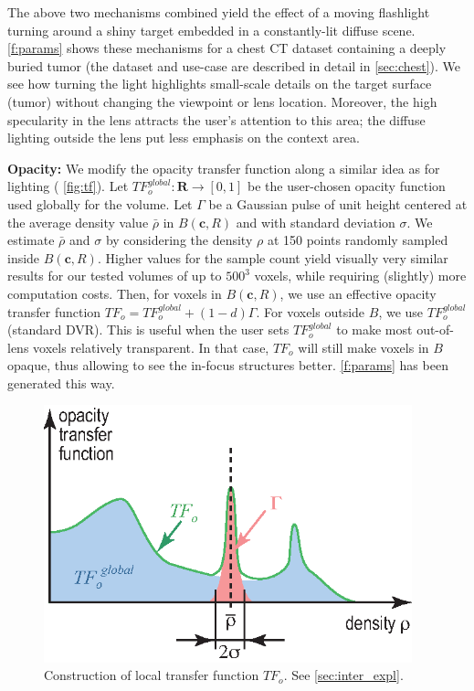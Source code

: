 The above two mechanisms combined yield the effect of a moving flashlight turning around a shiny target embedded in a constantly-lit diffuse scene. \autoref{f:params} shows these mechanisms for a chest CT dataset containing a deeply buried tumor (the dataset and use-case are described in detail in \autoref{sec:chest}). We see how turning the light highlights small-scale details on the target surface (tumor) without changing the viewpoint or lens location. Moreover, the high specularity in the lens attracts the user's attention to this area; the diffuse lighting outside the lens put less emphasis on the context area. 


\noindent\textbf{Opacity:} We modify the opacity transfer function along a similar idea as for lighting ( \autoref{fig:tf}). Let $TF_{o}^{global} : \mathbf{R} \rightarrow [0,1]$ be the user-chosen opacity function used globally for the volume. Let $\Gamma$ be a Gaussian pulse of unit height centered at the average density value $\bar{\rho}$ in $B(\mathbf{c},R)$ and with standard deviation $\sigma$. We estimate $\bar{\rho}$ and $\sigma$ by considering the density $\rho$ at 150 points randomly sampled inside $B(\mathbf{c},R)$. Higher values for the sample count yield visually very similar results for our tested volumes of up to $500^3$ voxels, while requiring (slightly) more computation costs. Then, for voxels in $B(\mathbf{c},R)$, we use an effective opacity transfer function $TF_o = TF_{o}^{global} + (1-d) \Gamma$. For voxels outside $B$, we use $TF_{o}^{global}$ (standard DVR).
This is useful when the user sets $TF_{o}^{global}$ to make most out-of-lens voxels relatively transparent. In that case, $TF_o$ will still make voxels in $B$ opaque, thus allowing to see the in-focus structures better. \autoref{f:params} has been generated this way.



\begin{figure}
\centering
\includegraphics[width=0.95\textwidth]{images/tf.eps}

\caption{Construction of local transfer function $TF_{o}$. See \autoref{sec:inter_expl}.}

\label{fig:tf}
\end{figure}


